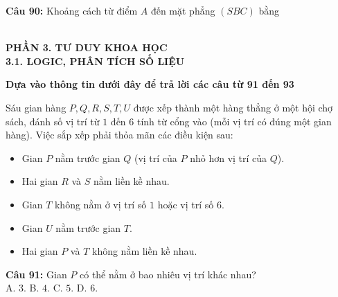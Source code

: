 \documentclass[12pt,a4paper]{article}
\begin{document}


\vspace{0.3cm}

\noindent \textbf{Câu 90:} Khoảng cách từ điểm $A$ đến mặt phẳng $(SBC)$ bằng\\
\noindent{}\\[0.25cm]
\noindent{}


\vspace{0.5cm}
\textbf{PHẦN 3. TƯ DUY KHOA HỌC\\ 3.1. LOGIC, PHÂN TÍCH SỐ LIỆU} \textit{}

\par\nobreak

\noindent\textbf{Dựa vào thông tin dưới đây để trả lời các câu từ 91 đến 93}%


\par\nobreak

Sáu gian hàng $P, Q, R, S, T, U$ được xếp thành một hàng thẳng ở một hội chợ sách, đánh số vị trí từ $1$ đến $6$ tính từ cổng vào (mỗi vị trí có đúng một gian hàng). Việc sắp xếp phải thỏa mãn các điều kiện sau:
\begin{itemize}
\item Gian $P$ nằm trước gian $Q$ (vị trí của $P$ nhỏ hơn vị trí của $Q$).
\item Hai gian $R$ và $S$ nằm liền kề nhau.
\item Gian $T$ không nằm ở vị trí số $1$ hoặc vị trí số $6$.
\item Gian $U$ nằm trước gian $T$.
\item Hai gian $P$ và $T$ không nằm liền kề nhau.
\end{itemize}

\par\nobreak


\noindent \textbf{Câu 91:} Gian $P$ có thể nằm ở bao nhiêu vị trí khác nhau?\\
\noindent A. $3$. \hfill B. $4$. \hfill C. $5$. \hfill D. $6$.



\vspace{0.3cm}
\end{document}
